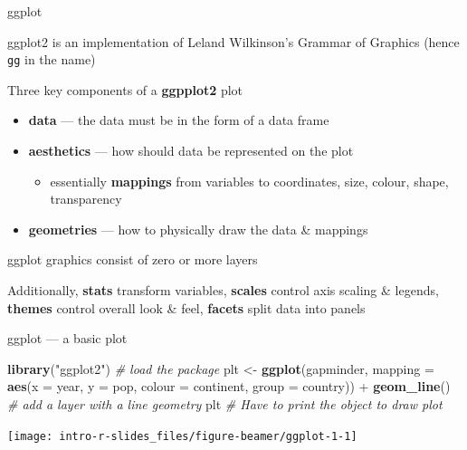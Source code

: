 \documentclass[10pt,ignorenonframetext,compress, aspectratio=169]{beamer}
\newenvironment{Shaded}{\begin{snugshade}}{\end{snugshade}}
\newcommand{\KeywordTok}[1]{\textcolor[rgb]{0.13,0.29,0.53}{\textbf{{#1}}}}
\newcommand{\DataTypeTok}[1]{\textcolor[rgb]{0.13,0.29,0.53}{{#1}}}
\newcommand{\StringTok}[1]{\textcolor[rgb]{0.31,0.60,0.02}{{#1}}}
\newcommand{\CommentTok}[1]{\textcolor[rgb]{0.56,0.35,0.01}{\textit{{#1}}}}
\newcommand{\NormalTok}[1]{{#1}}
\begin{document}
\begin{frame}{ggplot}

\alert{ggplot2} is an implementation of Leland Wilkinson's Grammar of
Graphics (hence \texttt{gg} in the name)

Three key components of a \textbf{ggpplot2} plot

\begin{itemize}
\itemsep1pt\parskip0pt
\item
  \textbf{data} --- the data must be in the form of a data frame
\item
  \textbf{aesthetics} --- how should data be represented on the plot

  \begin{itemize}
  \itemsep1pt\parskip0pt
  \item
    essentially \textbf{mappings} from variables to coordinates, size,
    colour, shape, transparency
  \end{itemize}
\item
  \textbf{geometries} --- how to physically draw the data \& mappings
\end{itemize}

ggplot graphics consist of zero or more layers

Additionally, \textbf{stats} transform variables, \textbf{scales}
control axis scaling \& legends, \textbf{themes} control overall look \&
feel, \textbf{facets} split data into panels

\end{frame}

\begin{frame}[fragile]{ggplot --- a basic plot}

\scriptsize

\begin{Shaded}
\begin{Highlighting}[]
\KeywordTok{library}\NormalTok{(}\StringTok{"ggplot2"}\NormalTok{)             }\CommentTok{# load the package}
\NormalTok{plt <-}\StringTok{ }\KeywordTok{ggplot}\NormalTok{(gapminder, }\DataTypeTok{mapping =} \KeywordTok{aes}\NormalTok{(}\DataTypeTok{x =} \NormalTok{year, }\DataTypeTok{y =} \NormalTok{pop, }\DataTypeTok{colour =} \NormalTok{continent, }\DataTypeTok{group =} \NormalTok{country)) +}
\StringTok{         }\KeywordTok{geom_line}\NormalTok{()           }\CommentTok{# add a layer with a line geometry}
\NormalTok{plt                            }\CommentTok{# Have to print the object to draw plot}
\end{Highlighting}
\end{Shaded}

\begin{center}\texttt{[image: intro-r-slides\_files/figure-beamer/ggplot-1-1]} \end{center}

\normalsize

\end{frame}
\end{document}
